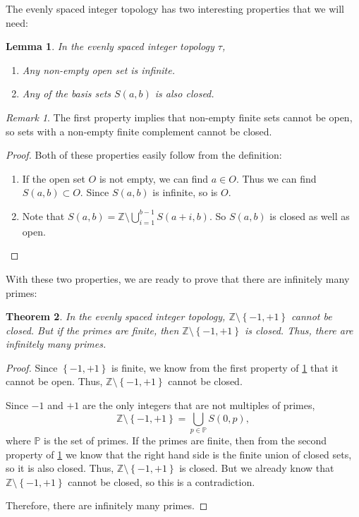 \documentclass[a4paper]{article}
\newtheorem{theorem}{Theorem}[section]
\newtheorem{lemma}[theorem]{Lemma}
\theoremstyle{definition}
\theoremstyle{remark}
\newtheorem*{remark}{Remark}
\begin{document}
The evenly spaced integer topology has two interesting properties that we will need:
\begin{lemma}
  In the evenly spaced integer topology $\tau$,
  \begin{enumerate}
    \item Any non-empty open set is infinite.
    \item Any of the basis sets $S(a,b)$ is also closed.
  \end{enumerate}
  \label{lem:2prop}
\end{lemma}
\begin{remark}
  The first property implies that non-empty finite sets cannot be open, so sets with a non-empty finite complement cannot be closed.
  \label{rem:2prop}
\end{remark}
\begin{proof}
  Both of these properties easily follow from the definition:
  \begin{enumerate}
    \item If the open set $O$ is not empty, we can find $a\in O$. Thus we can find $S(a,b)\subset O$. Since $S(a,b)$ is infinite, so is $O$.
    \item Note that $\displaystyle S(a,b)=\mathbb{Z}\setminus \bigcup\limits_{i=1}^{b-1}S(a+i,b)$. So $S(a,b)$ is closed as well as open.
  \end{enumerate}
\end{proof}
With these two properties, we are ready to prove that there are infinitely many primes:
\begin{theorem}
  In the evenly spaced integer topology, $\mathbb{Z}\setminus\left\{ -1,+1 \right\}$ cannot be closed. But if the primes are finite, then $\mathbb{Z}\setminus\left\{ -1,+1 \right\}$ is closed. Thus, there are infinitely many primes.
  \label{thm:topPrimes}
\end{theorem}
\begin{proof}
  Since $\left\{ -1,+1 \right\}$ is finite, we know from the first property of \cref{lem:2prop} that it cannot be open. Thus, $\mathbb{Z}\setminus\left\{ -1,+1 \right\}$ cannot be closed.

  Since $-1$ and $+1$ are the only integers that are not multiples of primes,
  \[
  \mathbb{Z}\setminus\left\{ -1,+1 \right\}=\bigcup\limits_{p\in\mathbb{P}}S(0,p)
  ,
  \]
  where $\mathbb{P}$ is the set of primes.
  If the primes are finite, then from the second property of \cref{lem:2prop} we know that the right hand side is the finite union of closed sets, so it is also closed. Thus, $\mathbb{Z}\setminus\left\{ -1,+1 \right\}$ is closed. But we already know that $\mathbb{Z}\setminus\left\{ -1,+1 \right\}$ cannot be closed, so this is a contradiction.

  Therefore, there are infinitely many primes.
\end{proof}
\end{document}
